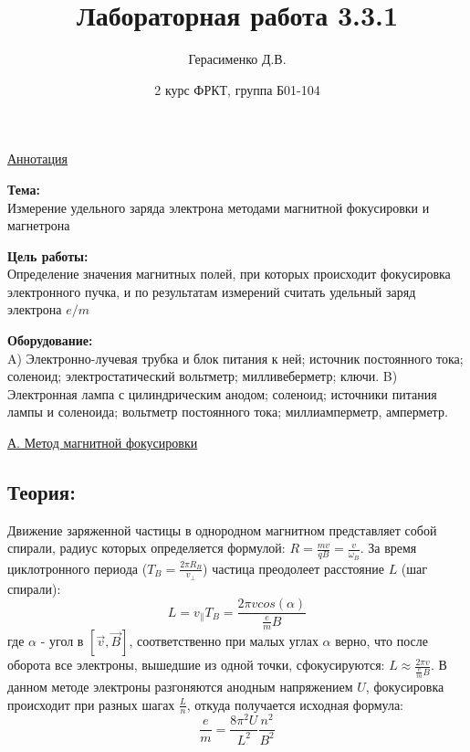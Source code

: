 \documentclass{article}
\title{
    \textbf{Лабораторная работа 3.3.1}
}
\author{Герасименко Д.В.}
\date{2 курс ФРКТ, группа Б01-104}
\begin{document}
\maketitle

\begin{center}
    \raggedleft
        \underline{\underline{\LARGE {Аннотация}}}
\end{center}

\begin{center}
\raggedright
    \large{\textbf{Тема:}}
    \\
    \large {Измерение удельного заряда электрона методами магнитной фокусировки и магнетрона}
    
    \large{\textbf{Цель работы:}}
    \\
    \large {Определение значения магнитных полей, при которых происходит фокусировка электронного пучка, и по результатам измерений считать удельный заряд электрона $e/m$}
    
    \large{\textbf{Оборудование:}}
    \\
    \large{ A) Электронно-лучевая трубка и блок питания к ней; источник постоянного тока; соленоид; электростатический вольтметр; милливеберметр; ключи. B) Электронная лампа с цилиндрическим анодом; соленоид; источники питания лампы и соленоида; вольтметр постоянного тока; миллиамперметр, амперметр.}
\end{center}

\begin{center}
    \underline{\large {А. Метод магнитной фокусировки}}
\end{center}

\subsection* {Теория:}
Движение заряженной частицы в однородном магнитном представляет собой спирали, радиус которых определяется формулой: \(R = \frac{mv}{qB} = \frac{v}{\omega_{B}}\). За время циклотронного периода (\(T_{B} = \frac{2\pi R_{B}}{v_{\perp}}\)) частица преодолеет расстояние \(L\) (шаг спирали):
\begin{equation*}
    L = v_{\parallel} T_{B} = \frac{2\pi v cos(\alpha)}{\frac{e}{m} B}
\end{equation*}
где \(\alpha\) - угол в \([\overrightarrow{v},\overrightarrow{B}]\), соответственно при малых углах \(\alpha\) верно, что после оборота все электроны, вышедшие из одной точки, сфокусируются: \(L \approx \frac{2\pi v}{\frac{e}{m} B}\).
В данном методе электроны разгоняются анодным напряжением \(U\), фокусировка происходит при разных шагах \(\frac{L}{n}\), откуда получается исходная формула:
\begin{equation}
    \frac{e}{m} = \frac{8 \pi^{2} U}{L^{2}} \frac{n^{2}}{B^{2}}
\end{equation}
\end{document}
